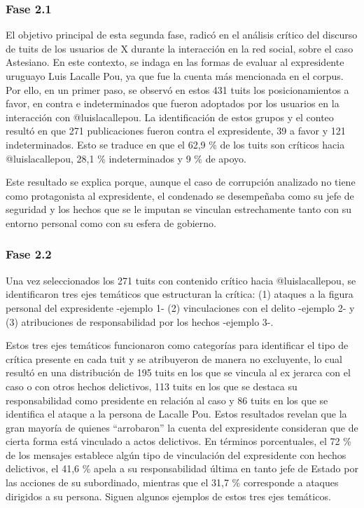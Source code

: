 \documentclass[spanish]{textolivre}
\begin{document}
\subsubsection{Fase 2.1}\label{sec-quotesandfootnotes}
El objetivo principal de esta segunda fase, radicó en el análisis crítico del discurso de tuits de los usuarios de X durante la interacción en la red social, sobre el caso Astesiano. En este contexto, se indaga en las formas de evaluar al expresidente uruguayo Luis Lacalle Pou, ya que fue la cuenta más mencionada en el corpus. Por ello, en un primer paso, se observó en estos 431 tuits los posicionamientos a favor, en contra e indeterminados que fueron adoptados por los usuarios en la interacción con @luislacallepou. La identificación de estos grupos y el conteo resultó en que 271 publicaciones fueron contra el expresidente, 39 a favor y 121 indeterminados. Esto se traduce en que el 62,9 \% de los tuits son críticos hacia @luislacallepou, 28,1 \% indeterminados y 9 \% de apoyo.

Este resultado se explica porque, aunque el caso de corrupción analizado no tiene como protagonista al expresidente, el condenado se desempeñaba como su jefe de seguridad y los hechos que se le imputan se vinculan estrechamente tanto con su entorno personal como con su esfera de gobierno.

\subsubsection{Fase 2.2}\label{sec-equacao}
Una vez seleccionados los 271 tuits con contenido crítico hacia @luislacallepou, se identificaron tres ejes temáticos que estructuran la crítica: (1) ataques a la figura personal del expresidente -ejemplo 1- (2) vinculaciones con el delito -ejemplo 2- y (3) atribuciones de responsabilidad por los hechos -ejemplo 3-.

Estos tres ejes temáticos funcionaron como categorías para identificar el tipo de crítica presente en cada tuit y se atribuyeron de manera no excluyente, lo cual resultó en una distribución de 195 tuits en los que se vincula al ex jerarca con el caso o con otros hechos delictivos, 113 tuits en los que se destaca su responsabilidad como presidente en relación al caso y 86 tuits en los que se identifica el ataque a la persona de Lacalle Pou. Estos resultados revelan que la gran mayoría de quienes “arrobaron” la cuenta del expresidente consideran que de cierta forma está vinculado a actos delictivos. En términos porcentuales, el 72 \% de los mensajes establece algún tipo de vinculación del expresidente con hechos delictivos, el 41,6 \% apela a su responsabilidad última en tanto jefe de Estado por las acciones de su subordinado, mientras que el 31,7 \% corresponde a ataques dirigidos a su persona. Siguen algunos ejemplos de estos tres ejes temáticos.
\end{document}
